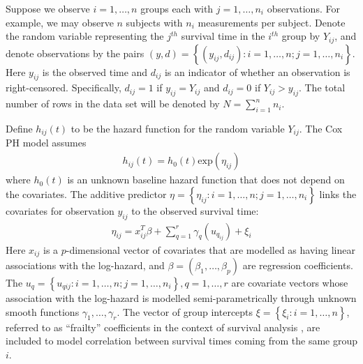 \documentclass[]{article}
\begin{document}
Suppose we observe $i = 1,\ldots,n$ groups each with $j = 1,\ldots,n_{i}$ observations. For example, we may observe $n$ subjects with $n_{i}$ measurements per subject. Denote the random variable representing the $j^{th}$ survival time in the $i^{th}$ group by $Y_{ij}$, and denote observations by the pairs $(y,d) =  \left\{(y_{ij},d_{ij}): i = 1,\ldots,n; j = 1,\ldots,n_{i} \right\}$. Here $y_{ij}$ is the observed time and $d_{ij}$ is an indicator of whether an observation is right-censored. Specifically, $d_{ij} = 1$ if $y_{ij} = Y_{ij}$ and $d_{ij} = 0$ if $Y_{ij} > y_{ij}$. The total number of rows in the data set will be denoted by $N = \sum_{i=1}^{n}n_{i}$.

Define $h_{ij}(t)$ to be the hazard function for the random variable $Y_{ij}$. The Cox PH model assumes \citep{coxph}
\begin{equation}\begin{aligned}\label{eqn:CoxHazardModel}
h_{ij}(t) = h_0(t)\text{exp}(\eta_{ij})
\end{aligned}\end{equation}
where $h_0(t)$ is an unknown baseline hazard function that does not depend on the covariates. The additive predictor $\eta = \left\{ \eta_{ij}: i = 1,\ldots,n; j = 1,\ldots,n_{i}\right\}$ links the covariates for observation $y_{ij}$ to the observed survival time:
\begin{equation}\begin{aligned}\label{eqn:eta}
\eta_{ij} =x_{ij}^{T}\beta+\sum_{q=1}^{r} \gamma_q(u_{q_{ij}}) +\xi_{i}
\end{aligned}\end{equation}
Here $x_{ij}$ is a $p$-dimensional vector of covariates that are modelled as having linear associations with the log-hazard, and $\beta = (\beta_{1},\ldots,\beta_{p})$ are regression coefficients. The $u_{q} = \left\{u_{qij}: i = 1,\ldots,n; j = 1,\ldots,n_{i} \right\}, q = 1,\ldots,r$ are covariate vectors whose association with the log-hazard is modelled semi-parametrically through unknown smooth functions $\gamma_1,\ldots,\gamma_r$. The vector of group intercepts $\xi = \left\{ \xi_{i}: i=1,\ldots,n\right\}$, referred to as ``frailty'' coefficients in the context of survival analysis \citep{frailty}, are included to model correlation between survival times coming from the same group $i$.
\end{document}

